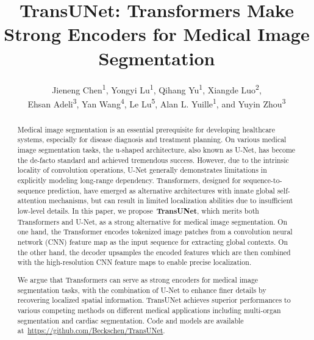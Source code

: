 \documentclass[runningheads]{llncs}
\begin{document}
\title{TransUNet: Transformers Make Strong Encoders for Medical Image Segmentation}
\author{Jieneng Chen\textsuperscript{1}, Yongyi Lu\textsuperscript{1}, Qihang Yu\textsuperscript{1},
Xiangde Luo\textsuperscript{2}, \\Ehsan Adeli\textsuperscript{3}, Yan Wang\textsuperscript{4}, Le Lu\textsuperscript{5}, Alan L. Yuille\textsuperscript{1}, and Yuyin Zhou\textsuperscript{3}}


\maketitle \begin{abstract}
Medical image segmentation is an essential prerequisite for developing healthcare systems, especially for disease diagnosis and treatment planning. 
On various medical image segmentation tasks, the u-shaped architecture, also known as U-Net, has become the de-facto standard and achieved tremendous success.
However, due to the intrinsic locality of convolution operations, U-Net generally demonstrates limitations in explicitly modeling long-range dependency.
Transformers, designed for sequence-to-sequence prediction, have emerged as alternative architectures with innate global self-attention mechanisms, but can result in limited localization abilities due to insufficient low-level details.
In this paper, we propose~\textbf{TransUNet}, which merits both Transformers and U-Net, as a strong alternative for medical image segmentation.
On one hand, the Transformer encodes tokenized image patches from a convolution neural network (CNN) feature map as the input sequence for extracting global contexts. On the other hand, the decoder upsamples the encoded features which are then combined with the high-resolution CNN feature maps to enable precise localization.

We argue that Transformers can serve as strong encoders for medical image segmentation tasks, with the combination of U-Net to enhance finer details by recovering localized spatial information. TransUNet achieves superior performances to various competing methods on different medical applications including multi-organ segmentation and cardiac segmentation. Code and models are available at~\url{https://github.com/Beckschen/TransUNet}.

\end{abstract}
\end{document}
